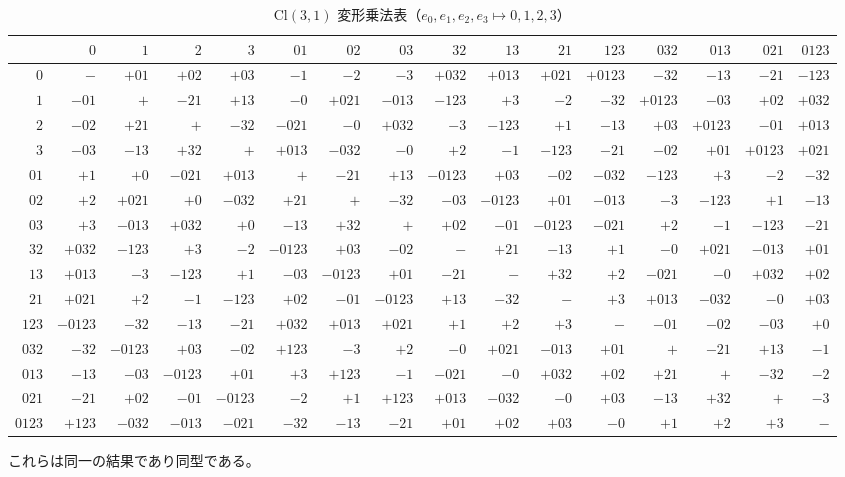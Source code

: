 \documentclass[dvipdfmx,a4paper]{article}
\begin{document}
\begin{table}[ht]
  \begin{center}
    \caption{$\mathrm{Cl}(3,1)$ 変形乗法表（$e_0, e_1, e_2, e_3 \mapsto 0,1,2,3$）}
    \scriptsize
    \begin{tabular}{r|rrrrrrrrrrrrrrr}
      &$0$&$1$&$2$&$3$&$01$&$02$&$03$&$32$&$13$&$21$&$123$&$032$&$013$&$021$&$0123$\\\hline
      $0$&$-$&$+01$&$+02$&$+03$&$-1$&$-2$&$-3$&$+032$&$+013$&$+021$&$+0123$&$-32$&$-13$&$-21$&$-123$\\
      $1$&$-01$&$+$&$-21$&$+13$&$-0$&$+021$&$-013$&$-123$&$+3$&$-2$&$-32$&$+0123$&$-03$&$+02$&$+032$\\
      $2$&$-02$&$+21$&$+$&$-32$&$-021$&$-0$&$+032$&$-3$&$-123$&$+1$&$-13$&$+03$&$+0123$&$-01$&$+013$\\
      $3$&$-03$&$-13$&$+32$&$+$&$+013$&$-032$&$-0$&$+2$&$-1$&$-123$&$-21$&$-02$&$+01$&$+0123$&$+021$\\
      $01$&$+1$&$+0$&$-021$&$+013$&$+$&$-21$&$+13$&$-0123$&$+03$&$-02$&$-032$&$-123$&$+3$&$-2$&$-32$\\
      $02$&$+2$&$+021$&$+0$&$-032$&$+21$&$+$&$-32$&$-03$&$-0123$&$+01$&$-013$&$-3$&$-123$&$+1$&$-13$\\
      $03$&$+3$&$-013$&$+032$&$+0$&$-13$&$+32$&$+$&$+02$&$-01$&$-0123$&$-021$&$+2$&$-1$&$-123$&$-21$\\
      $32$&$+032$&$-123$&$+3$&$-2$&$-0123$&$+03$&$-02$&$-$&$+21$&$-13$&$+1$&$-0$&$+021$&$-013$&$+01$\\
      $13$&$+013$&$-3$&$-123$&$+1$&$-03$&$-0123$&$+01$&$-21$&$-$&$+32$&$+2$&$-021$&$-0$&$+032$&$+02$\\
      $21$&$+021$&$+2$&$-1$&$-123$&$+02$&$-01$&$-0123$&$+13$&$-32$&$-$&$+3$&$+013$&$-032$&$-0$&$+03$\\
      $123$&$-0123$&$-32$&$-13$&$-21$&$+032$&$+013$&$+021$&$+1$&$+2$&$+3$&$-$&$-01$&$-02$&$-03$&$+0$\\
      $032$&$-32$&$-0123$&$+03$&$-02$&$+123$&$-3$&$+2$&$-0$&$+021$&$-013$&$+01$&$+$&$-21$&$+13$&$-1$\\
      $013$&$-13$&$-03$&$-0123$&$+01$&$+3$&$+123$&$-1$&$-021$&$-0$&$+032$&$+02$&$+21$&$+$&$-32$&$-2$\\
      $021$&$-21$&$+02$&$-01$&$-0123$&$-2$&$+1$&$+123$&$+013$&$-032$&$-0$&$+03$&$-13$&$+32$&$+$&$-3$\\
      $0123$&$+123$&$-032$&$-013$&$-021$&$-32$&$-13$&$-21$&$+01$&$+02$&$+03$&$-0$&$+1$&$+2$&$+3$&$-$\\
    \end{tabular}
  \end{center}
\end{table}
これらは同一の結果であり同型である。
\clearpage
\end{document}
